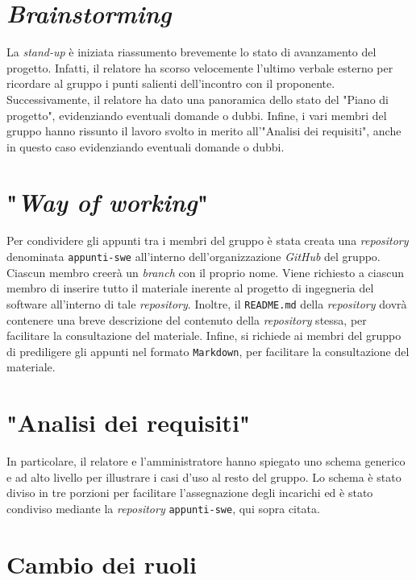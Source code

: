 \section{\textit{Brainstorming}}

La \textit{stand-up} è iniziata riassumento brevemente lo stato di avanzamento
del progetto. Infatti, il relatore ha scorso velocemente l'ultimo verbale
esterno per ricordare al gruppo i punti salienti dell'incontro con il
proponente. Successivamente, il relatore ha dato una panoramica dello stato del
"Piano di progetto", evidenziando eventuali domande o dubbi. Infine, i vari
membri del gruppo hanno rissunto il lavoro svolto in merito all'"Analisi dei
requisiti", anche in questo caso evidenziando eventuali domande o dubbi.

\section{"\textit{Way of working}"}

Per condividere gli appunti tra i membri del gruppo è stata creata una
\textit{repository} denominata \texttt{appunti-swe} all'interno
dell'organizzazione \textit{GitHub} del gruppo. Ciascun membro creerà un
\textit{branch} con il proprio nome. Viene richiesto a ciascun membro di
inserire tutto il materiale inerente al progetto di ingegneria del software
all'interno di tale \textit{repository}. Inoltre, il \texttt{README.md} della
\textit{repository} dovrà contenere una breve descrizione del contenuto della
\textit{repository} stessa, per facilitare la consultazione del materiale.
Infine, si richiede ai membri del gruppo di prediligere gli appunti nel formato
\texttt{Markdown}, per facilitare la consultazione del materiale.

\section{"Analisi dei requisiti"}

In particolare, il relatore e l'amministratore hanno spiegato uno schema
generico e ad alto livello per illustrare i casi d'uso al resto del gruppo. Lo
schema è stato diviso in tre porzioni per facilitare l'assegnazione degli
incarichi ed è stato condiviso mediante la \textit{repository}
\texttt{appunti-swe}, qui sopra citata.

\section{Cambio dei ruoli}

